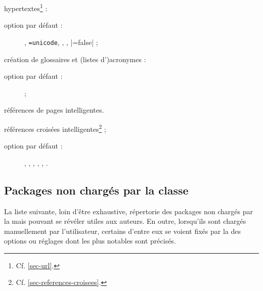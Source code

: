 \documentclass[english,nolocaltoc]{nwejmart}
\newtheorem[style=definition]{fait}
\newtheorem[title=expérience]{experience}
\newtheorem[title-plural=anneaux]{anneau}
\newtheorem[title=idéal,title-plural=idéaux]{ideal}
\begin{document}
\begin{description}
  hypertextes\footnote{Cf. \vref{sec-url}.} :
  \begin{description}
  \item[option par défaut :] ,
    \lstinline[alsolanguage={[hyperref]TeX}]|=unicode|,
    , ,
    |=false| ;
  \end{description}
\item[\package{glossaries} :] création de glossaires et (listes d')acronymes :
  \begin{description}
  \item[option par défaut :]  ;
  \end{description}
\item[\package{varioref} :] références de pages intelligentes.
\item[\package{cleveref} :] références croisées
  intelligentes\footnote{Cf. \vref{sec-references-croisees}.} ;
  \begin{description}
  \item[option par défaut :] , ,
    , , ,
    .
  \end{description}
\end{description}

\subsection{Packages non  chargés par la classe}\label{sec:packages-non-charges}

La liste suivante, loin d'être exhaustive, répertorie des packages non chargés
par la \nwejmauthorcl{} mais pouvant se révéler utiles aux auteurs.  En outre,
lorsqu'ils sont chargés manuellement par l'utilisateur, certains d'entre eux se
voient fixés par la \nwejmauthorcl{} des options ou réglages dont les plus
notables sont précisés.
\end{document}
